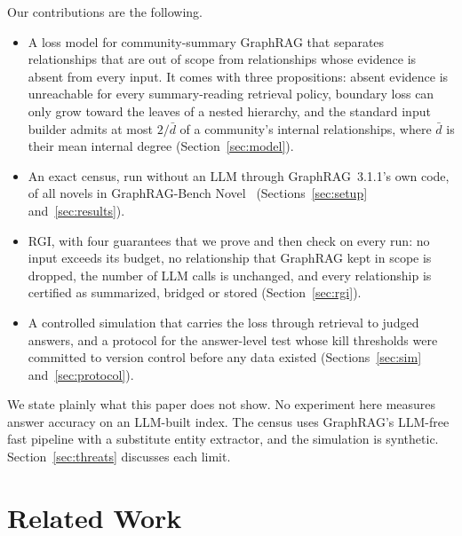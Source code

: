 \documentclass{ieeeaccess}
\theoremstyle{remark}
\begin{document}
Our contributions are the following.
\begin{itemize}
\item A loss model for community-summary GraphRAG that separates relationships that are out of scope from relationships whose evidence is absent from every input. It comes with three propositions: absent evidence is unreachable for every summary-reading retrieval policy, boundary loss can only grow toward the leaves of a nested hierarchy, and the standard input builder admits at most $2/\bar d$ of a community's internal relationships, where $\bar d$ is their mean internal degree (Section~\ref{sec:model}).
\item An exact census, run without an LLM through GraphRAG~3.1.1's own code, of all \NNovels{} novels in GraphRAG-Bench Novel~\cite{xiang2026graphragbench} (Sections~\ref{sec:setup} and~\ref{sec:results}).
\item RGI, with four guarantees that we prove and then check on every run: no input exceeds its budget, no relationship that GraphRAG kept in scope is dropped, the number of LLM calls is unchanged, and every relationship is certified as summarized, bridged or stored (Section~\ref{sec:rgi}).
\item A controlled simulation that carries the loss through retrieval to judged answers, and a protocol for the answer-level test whose kill thresholds were committed to version control before any data existed (Sections~\ref{sec:sim} and~\ref{sec:protocol}).
\end{itemize}

We state plainly what this paper does not show. No experiment here measures answer accuracy on an LLM-built index. The census uses GraphRAG's LLM-free fast pipeline with a substitute entity extractor, and the simulation is synthetic. Section~\ref{sec:threats} discusses each limit.

\section{Related Work}\label{sec:related}
\end{document}
